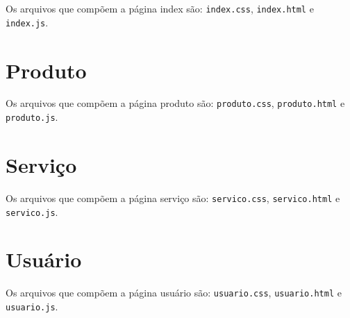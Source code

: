 Os arquivos que compõem a página index são: \texttt{index.css}, \texttt{index.html} e
\texttt{index.js}.

\section{Produto}

Os arquivos que compõem a página produto são: \texttt{produto.css}, \texttt{produto.html} e
\texttt{produto.js}.

\section{Serviço}

Os arquivos que compõem a página serviço são: \texttt{servico.css}, \texttt{servico.html} e
\texttt{servico.js}.

\section{Usuário}

Os arquivos que compõem a página usuário são: \texttt{usuario.css}, \texttt{usuario.html} e
\texttt{usuario.js}.
